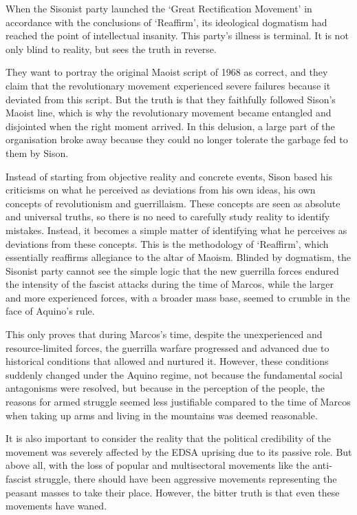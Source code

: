 When the Sisonist party launched 
the `Great Rectification Movement' 
in accordance with the conclusions of `Reaffirm', 
its ideological dogmatism had reached 
the point of intellectual insanity. 
This party's illness is terminal. 
It is not only blind to reality, 
but sees the truth in reverse.

They want to portray the original Maoist script of 1968 as correct, 
and they claim that the revolutionary movement 
experienced severe failures 
because it deviated from this script. 
But the truth is that they faithfully followed Sison's Maoist line, 
which is why the revolutionary movement 
became entangled and disjointed 
when the right moment arrived. 
In this delusion, 
a large part of the organisation broke away 
because they could no longer tolerate the garbage fed to them by Sison.

Instead of starting from objective reality and concrete events, 
Sison based his criticisms 
on what he perceived as deviations 
from his own ideas, 
his own concepts of revolutionism and guerrillaism. 
These concepts are seen as absolute and universal truths, 
so there is no need to carefully study reality to identify mistakes. 
Instead, it becomes a simple matter of identifying 
what he perceives as deviations from these concepts. 
This is the methodology of `Reaffirm', 
which essentially reaffirms allegiance to the altar of Maoism. 
Blinded by dogmatism, 
the Sisonist party cannot see the simple logic 
that the new guerrilla forces endured 
the intensity of the fascist attacks 
during the time of Marcos, 
while the larger and more experienced forces, 
with a broader mass base, 
seemed to crumble in the face of Aquino's rule.

This only proves that during Marcos's time, 
despite the unexperienced and resource-limited forces, 
the guerrilla warfare progressed and advanced 
due to historical conditions that allowed and nurtured it. 
However, these conditions suddenly changed under the Aquino regime, 
not because the fundamental social antagonisms were resolved, 
but because in the perception of the people, 
the reasons for armed struggle seemed less justifiable 
compared to the time of Marcos 
when taking up arms and living in the mountains was deemed reasonable.

It is also important to consider the reality 
that the political credibility of the movement 
was severely affected by the EDSA uprising 
due to its passive role. 
But above all, with the loss of popular and multisectoral movements 
like the anti-fascist struggle, 
there should have been aggressive movements representing the peasant masses 
to take their place. 
However, the bitter truth is that even these movements have waned.



